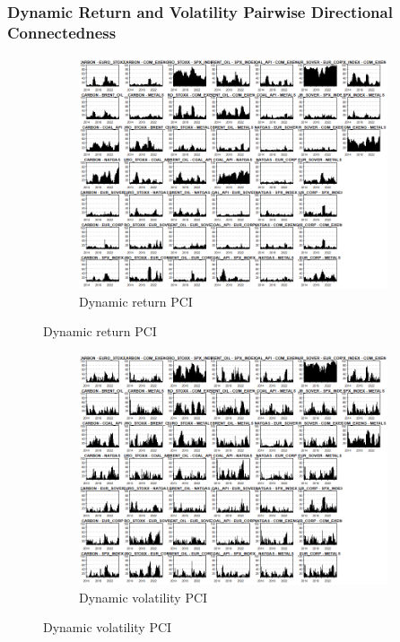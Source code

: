 \documentclass[preprint, 3p,
authoryear]{elsarticle} %
\begin{document}
\begin{landscape}
\newpage

\subsubsection{Dynamic Return and Volatility Pairwise Directional Connectedness}

\begin{figure}[!ht]
  \caption{Dynamic Return and Volatility Pairwise Connectedness Index (Jan 2013 – Jan 2025)}
  \centering
  \begin{subfigure}[a]{\textwidth}
    \caption{Dynamic return PCI}
    \includegraphics[width = 1.1\linewidth]{22aApdxD-8-220-RetPCI}
  \end{subfigure}
\end{figure}
\begin{figure}[!ht]
  \ContinuedFloat
  \centering
    \begin{subfigure}[b]{\textwidth}\ContinuedFloat
      \caption{Dynamic volatility PCI}
      \includegraphics[width = 1.2\linewidth]{22bApdxD-8-220-VolPCI}
    \end{subfigure}
\end{figure}











\end{landscape}
\end{document}
